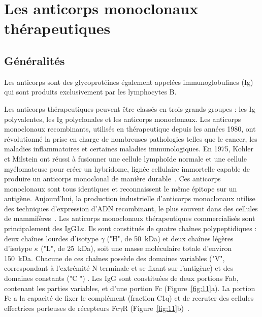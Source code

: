 \section{Les anticorps monoclonaux thérapeutiques}
\subsection{Généralités}
Les anticorps sont des glycoprotéines également appelées immunoglobulines (Ig) qui sont produits exclusivement par les lymphocytes B.

Les anticorps thérapeutiques peuvent être classés en trois grands groupes : les Ig polyvalentes, les Ig polyclonales et les anticorps monoclonaux. Les anticorps monoclonaux recombinants, utilisés en thérapeutique depuis les années 1980, ont révolutionné la prise en charge de nombreuses pathologies telles que le cancer, les maladies inflammatoires et certaines maladies immunologiques. En 1975, Kohler et Milstein ont réussi à fusionner une cellule lymphoïde normale et une cellule myélomateuse pour créer un hybridome, lignée cellulaire immortelle capable de produire un anticorps monoclonal de manière durable~\citep{REF13}. Ces anticorps monoclonaux sont tous identiques et reconnaissent le même épitope sur un antigène. Aujourd'hui, la production industrielle d'anticorps monoclonaux utilise des techniques d'expression d'ADN recombinant, le plus souvent dans des cellules de mammifères~\citep{REF14, REF15}. Les anticorps monoclonaux thérapeutiques commercialisés sont principalement des IgG1$\kappa$. Ils sont constitués de quatre chaînes polypeptidiques : deux chaînes lourdes d'isotype $\gamma$ ("H", de 50~k\gls{Da}) et deux chaînes légères d'isotype $\kappa$ ("L", de 25~k\gls{Da}), soit une masse moléculaire totale d'environ 150~k\gls{Da}. Chacune de ces chaînes possède des domaines variables ("V", correspondant à l'extrémité N terminale et se fixant sur l'antigène) et des domaines constants ("C ") . Les IgG sont constituées de deux portions Fab, contenant les parties variables, et d'une portion Fc (Figure~\ref{fig:11}a). La portion Fc a la capacité de fixer le complément (fraction C1q) et de recruter des cellules effectrices porteuses de récepteurs Fc$\gamma$R (Figure~\ref{fig:11}b)~\citep{REF16}.

